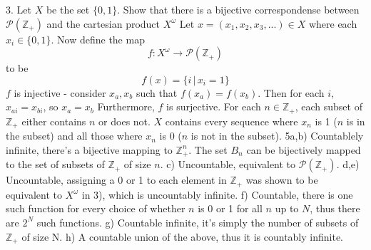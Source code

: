 \documentclass[12pt,letterpaper]{article}
\newcommand{\n}{\break}
\begin{document}
\raggedright
3. Let $X$ be the set $\{0,1\}$. Show that there is a bijective correspondense between $\mathcal{P}(\mathbb{Z}_+)$ and the cartesian product $X^\omega$ \n
Let $x=(x_1, x_2, x_3, ...)\in X$ where each $x_i\in \{0,1\}$. \n
Now define the map
$$f : X^\omega \rightarrow \mathcal{P}(\mathbb{Z}_+)$$
to be
$$f(x) = \{i\, |\, x_i=1\}$$
$f$ is injective - consider $x_a, x_b$ such that $f(x_a)=f(x_b)$.
Then for each $i$, $x_{ai}=x_{bi}$, so $x_a=x_b$ \n
Furthermore, $f$ is surjective. For each $n\in\mathbb{Z}_+$, each subset of $\mathbb{Z}_+$ either contains $n$ or does not. $X$ contains every sequence where $x_n$ is 1 ($n$ is in the subset) and all those where $x_n$ is 0 ($n$ is not in the subset).
\n
\n
5a,b) Countablely infinite, there's a bijective mapping to $\mathbb{Z}_+^n$.
The set $B_n$ can be bijectively mapped to the set of subsets of $\mathbb{Z}_+$ of size $n$.\n
c) Uncountable, equivalent to $\mathcal{P}(\mathbb{Z}_+)$.\n
d,e) Uncountable, assigning a 0 or 1 to each element in $\mathbb{Z}_+$ was shown to be equivalent to $X^\omega$ in 3), which is uncountably infinite.\n
f) Countable, there is one such function for every choice of whether $n$ is 0 or 1 for all $n$ up to $N$, thus there are $2^N$ such functions.\n
g) Countable infinite, it's simply the number of subsets of $\mathbb{Z}_+$ of size N.\n
h) A countable union of the above, thus it is countably infinite.\n
\end{document}
